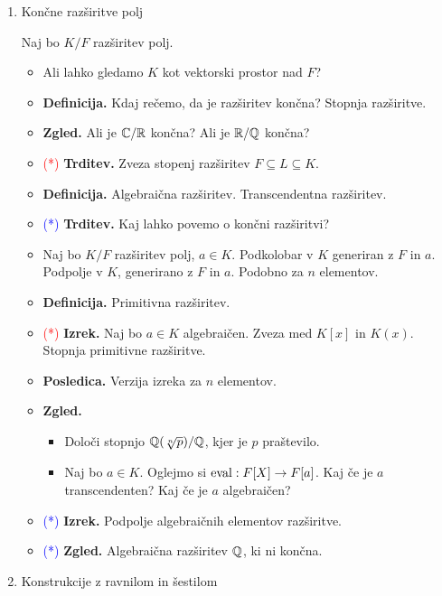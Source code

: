 \begin{enumerate}
    \newpage
    \item Končne razširitve polj 
    
    Naj bo \(K/F\) razširitev polj.
    \begin{itemize}
        \item Ali lahko gledamo \(K\) kot vektorski prostor nad \(F\)?
        \item \textbf{Definicija.} Kdaj rečemo, da je razširitev končna? Stopnja razširitve.
        \item \textbf{Zgled.} Ali je \(\mathbb{C}/\mathbb{R}\) končna? Ali je \(\mathbb{R}/\mathbb{Q}\) končna?
        \item \textcolor{red}{(*)} \textbf{Trditev.} Zveza stopenj razširitev \(F \subseteq L \subseteq K\).
        \item \textbf{Definicija.} Algebraična razširitev. Transcendentna razširitev.
        \item \textcolor{blue}{(*)} \textbf{Trditev.} Kaj lahko povemo o končni razširitvi?
        \item Naj bo \(K/F\) razširitev polj, \(a \in K\). Podkolobar v \(K\) generiran z \(F\) in \(a\). Podpolje v \(K\), generirano z \(F\) in \(a\). Podobno za \(n\) elementov.
        \item \textbf{Definicija.} Primitivna razširitev.
        \item \textcolor{red}{(*)} \textbf{Izrek.} Naj bo \(a \in K\) algebraičen. Zveza med \(K[x]\) in \(K(x)\). Stopnja primitivne razširitve.
        \item \textbf{Posledica.} Verzija izreka za \(n\) elementov.
        \item \textbf{Zgled.}
        \begin{itemize}
            \item Določi stopnjo \(\mathbb{Q}(\sqrt[n]{p})/\mathbb{Q}\), kjer je \(p\) praštevilo. 
            \item Naj bo \(a \in K\). Oglejmo si \(\operatorname{eval}: F[X] \to F[a]\). Kaj če je \(a\) transcendenten? Kaj če je \(a\) algebraičen?
        \end{itemize}
        \item \textcolor{blue}{(*)} \textbf{Izrek.} Podpolje algebraičnih elementov razširitve.
        \item \textcolor{blue}{(*)} \textbf{Zgled.} Algebraična razširitev \(\mathbb{Q}\), ki ni končna.
    \end{itemize}

    \item Konstrukcije z ravnilom in šestilom
    

\end{enumerate}
